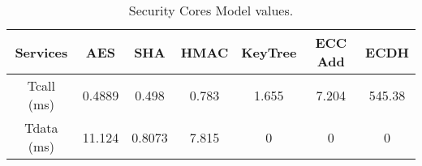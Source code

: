 \begin{table}[]
\centering
\def\arraystretch{1.5}
\begin{tabular}{|c|c|c|c|c|c|c|}
\hline
Services   & AES    & SHA    & HMAC  & KeyTree & ECC Add & ECDH   \\ \hline
Tcall (ms) & 0.4889 & 0.498  & 0.783 & 1.655   & 7.204   & 545.38 \\ \hline
Tdata (ms) & 11.124 & 0.8073 & 7.815 & 0       & 0       & 0      \\ \hline
\end{tabular}
\caption{Security Cores Model values.}
\label{tab:core-model}
\end{table}
